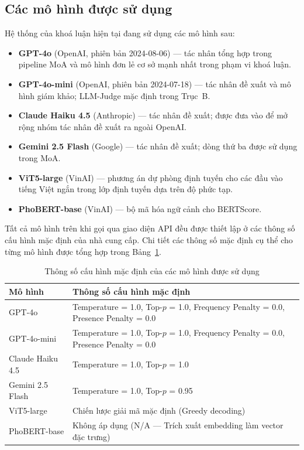 \subsection{Các mô hình được sử dụng}
Hệ thống của khoá luận hiện tại đang sử dụng các mô hình sau: 
\begin{itemize}
  \item \textbf{GPT-4o} (OpenAI, phiên bản 2024-08-06) --- tác nhân tổng hợp trong pipeline MoA và mô hình đơn lẻ cơ sở mạnh nhất trong phạm vi khoá luận.
  \item \textbf{GPT-4o-mini} (OpenAI, phiên bản 2024-07-18) --- tác nhân đề xuất và mô hình giám khảo; LLM-Judge mặc định trong Trục~B.
  \item \textbf{Claude Haiku 4.5} (Anthropic) --- tác nhân đề xuất; được đưa vào để mở rộng nhóm tác nhân đề xuất ra ngoài OpenAI.
  \item \textbf{Gemini 2.5 Flash} (Google) --- tác nhân đề xuất; dòng thứ ba được sử dụng trong MoA.
  \item \textbf{ViT5-large} (VinAI) --- phương án dự phòng định tuyến cho các đầu vào tiếng Việt ngắn trong lớp định tuyến dựa trên độ phức tạp.
  \item \textbf{PhoBERT-base} (VinAI) --- bộ mã hóa ngữ cảnh cho BERTScore.
\end{itemize}

Tất cả mô hình trên khi gọi qua giao diện API đều được thiết lập ở các thông số cấu hình mặc định của nhà cung cấp. Chi tiết các thông số mặc định cụ thể cho từng mô hình được tổng hợp trong Bảng~\ref{tab:model_parameters}.

\begin{table}[htbp]
\centering
\renewcommand{\arraystretch}{1.3} %
\caption{Thông số cấu hình mặc định của các mô hình được sử dụng}
\label{tab:model_parameters}
\begin{tabularx}{\textwidth}{l X}
\hline
\textbf{Mô hình} & \textbf{Thông số cấu hình mặc định} \\ \hline
GPT-4o & Temperature = 1.0, Top-$p$ = 1.0, Frequency Penalty = 0.0, Presence Penalty = 0.0 \\
GPT-4o-mini & Temperature = 1.0, Top-$p$ = 1.0, Frequency Penalty = 0.0, Presence Penalty = 0.0 \\
Claude Haiku 4.5 & Temperature = 1.0, Top-$p$ = 1.0 \\
Gemini 2.5 Flash & Temperature = 1.0, Top-$p$ = 0.95 \\
ViT5-large & Chiến lược giải mã mặc định (Greedy decoding) \\
PhoBERT-base & Không áp dụng (N/A --- Trích xuất embedding làm vector đặc trưng) \\ \hline
\end{tabularx}
\end{table}

